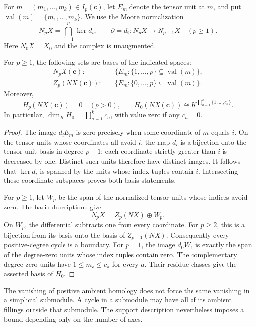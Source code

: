 For $m=(m_1,\ldots,m_k)\in I_p(\mathbf c)$, let $E_m$ denote the tensor
unit at $m$, and put $\operatorname{val}(m)=\{m_1,\ldots,m_k\}$.
We use the Moore normalization
\[
N_pX=\bigcap_{i=1}^p\ker d_i,\qquad
 \partial=d_0:N_pX\longrightarrow N_{p-1}X\quad(p\geq1).
\]
Here $N_0X=X_0$ and the complex is unaugmented.

\begin{proposition}
\label{prop:shifted-normalized-basis}
For $p\geq1$, the following sets are bases of the indicated spaces:
\begin{align*}
 N_pX(\mathbf c):&\quad
   \{E_m:\{1,\ldots,p\}\subseteq\operatorname{val}(m)\},\\
 Z_p(NX(\mathbf c)):&\quad
   \{E_m:\{0,\ldots,p\}\subseteq\operatorname{val}(m)\}.
\end{align*}
Moreover,
\begin{equation}\label{eq:shifted-ambient-homology}
 H_p(NX(\mathbf c))=0\quad(p>0),\qquad
 H_0(NX(\mathbf c))
 \cong K^{\prod_{a=1}^k\{1,\ldots,c_a\}}.
\end{equation}
In particular, $\dim_K H_0=\prod_{a=1}^k c_a$, with value zero if
any $c_a=0$.
\end{proposition}

\begin{proof}
The image $d_iE_m$ is zero precisely when some coordinate of $m$ equals
$i$. On the tensor units whose coordinates all avoid $i$, the map $d_i$
is a bijection onto the tensor-unit basis in degree $p-1$: each coordinate
strictly greater than $i$ is decreased by one. Distinct such units
therefore have distinct images. It follows that $\ker d_i$ is spanned by
the units whose index tuples contain $i$. Intersecting these coordinate
subspaces proves both basis statements.

For $p\geq1$, let $W_p$ be the span of the normalized tensor units whose
indices avoid zero. The basis descriptions give
\[
 N_pX=Z_p(NX)\oplus W_p.
\]
On $W_p$, the differential subtracts one from every coordinate. For
$p\geq2$, this is a bijection from its basis onto the basis of
$Z_{p-1}(NX)$. Consequently every positive-degree cycle is a boundary.
For $p=1$, the image $d_0W_1$ is exactly the span of the degree-zero units
whose index tuples contain zero. The complementary degree-zero units
have $1\leq m_a\leq c_a$ for every $a$. Their residue classes give the
asserted basis of $H_0$.
\end{proof}

The vanishing of positive ambient homology does not force the same
vanishing in a simplicial submodule. A cycle in a submodule may have all
of its ambient fillings outside that submodule. The support description
nevertheless imposes a bound depending only on the number of axes.

